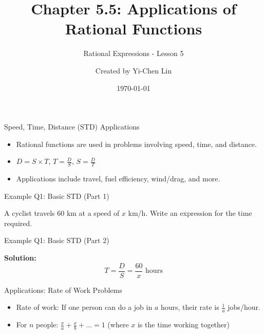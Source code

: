 \documentclass[aspectratio=169]{beamer}
\title{Chapter 5.5: Applications of Rational Functions}
\subtitle{Rational Expressions - Lesson 5}
\author{Created by Yi-Chen Lin}
\date{\today}
\begin{document}
\begin{frame}
\titlepage
\end{frame}

\begin{frame}{Speed, Time, Distance (STD) Applications}
\begin{tcolorbox}[colback=lightgray,colframe=primary,title=Key Concepts]
\footnotesize
\begin{itemize}
  \item Rational functions are used in problems involving speed, time, and distance.
  \item $D = S \times T$, $T = \frac{D}{S}$, $S = \frac{D}{T}$
  \item Applications include travel, fuel efficiency, wind/drag, and more.
\end{itemize}
\end{tcolorbox}
\end{frame}

\begin{frame}{Example Q1: Basic STD (Part 1)}
\begin{tcolorbox}[colback=lightgray,colframe=secondary,title=Example Q1 (Part 1)]
\footnotesize
A cyclist travels 60 km at a speed of $x$ km/h. Write an expression for the time required.
\end{tcolorbox}
\end{frame}

\begin{frame}{Example Q1: Basic STD (Part 2)}
\begin{tcolorbox}[colback=lightgray,colframe=secondary,title=Example Q1 (Part 2)]
\footnotesize
\textbf{Solution:}
\[
T = \frac{D}{S} = \frac{60}{x} \text{ hours}
\]
\end{tcolorbox}
\end{frame}

\begin{frame}{Applications: Rate of Work Problems}
\begin{tcolorbox}[colback=lightgray,colframe=primary,title=Key Concepts]
\footnotesize
\begin{itemize}
  \item Rate of work: If one person can do a job in $a$ hours, their rate is $\frac{1}{a}$ jobs/hour.
  \item For $n$ people: $\frac{x}{a} + \frac{x}{b} + ... = 1$ (where $x$ is the time working together)
\end{itemize}
\end{tcolorbox}
\end{frame}
\end{document}
